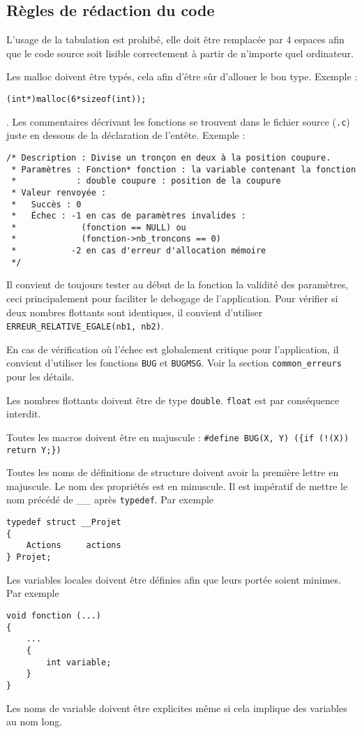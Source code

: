 \documentclass{article}
\begin{document}
\subsection{Règles de rédaction du code}
L'usage de la tabulation est prohibé, elle doit être remplacée par 4 espaces afin que le code source soit lisible correctement à partir de n'importe quel ordinateur.\par
Les malloc doivent être typés, cela afin d'être sûr d'allouer le bon type. Exemple : \begin{center}\texttt{(int*)malloc(6*sizeof(int));}\end{center}.
Les commentaires décrivant les fonctions se trouvent dans le fichier source (\texttt{.c}) juste en dessous de la déclaration de l'entête. Exemple :
\begin{verbatim}
/* Description : Divise un tronçon en deux à la position coupure.
 * Paramètres : Fonction* fonction : la variable contenant la fonction
 *            : double coupure : position de la coupure
 * Valeur renvoyée :
 *   Succès : 0
 *   Échec : -1 en cas de paramètres invalides :
 *             (fonction == NULL) ou
 *             (fonction->nb_troncons == 0)
 *           -2 en cas d'erreur d'allocation mémoire
 */
\end{verbatim}\par
Il convient de toujours tester au début de la fonction la validité des paramètres, ceci principalement pour faciliter le debogage de l'application.
Pour vérifier si deux nombres flottants sont identiques, il convient d'utiliser \texttt{ERREUR\_RELATIVE\_EGALE(nb1, nb2)}.\par
En cas de vérification où l'échec est globalement critique pour l'application, il convient d'utiliser les fonctions \texttt{BUG} et \texttt{BUGMSG}. Voir la section \texttt{common\_erreurs} pour les détails.\par
Les nombres flottants doivent être de type \texttt{double}. \texttt{float} est par conséquence interdit.\par
Toutes les macros doivent être en majuscule : \texttt{\#define BUG(X, Y) (\{if (!(X)) return Y;\})}\par
Toutes les noms de définitions de structure doivent avoir la première lettre en majuscule. Le nom des propriétés est en minuscule. Il est impératif de mettre le nom précédé de \_\_ après \texttt{typedef}. Par exemple \begin{verbatim}
typedef struct __Projet
{
    Actions     actions
} Projet;
\end{verbatim}\par
Les variables locales doivent être définies afin que leurs portée soient minimes. Par exemple \begin{verbatim}
void fonction (...)
{
    ...
    {
        int variable;
    }
}
\end{verbatim}\par
Les noms de variable doivent être explicites même si cela implique des variables au nom long.
\end{document}
